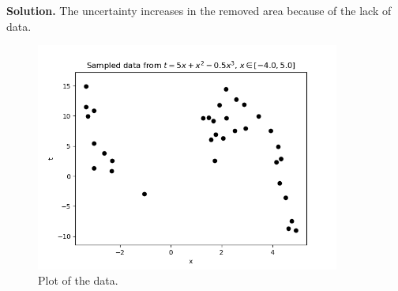 \documentclass[10pt]{article}
\begin{document}
\begin{itemize}
{\bf Solution.}
The uncertainty increases in the removed area because of the lack of data.
\begin{figure}[h!]
\begin{center}
\includegraphics[width=10cm]{figures/ex5_synth_data.png}
\caption{Plot of the data.\label{fig:data}}
\end{center}
\end{figure}

\begin{figure}[h!]
\begin{center}


\end{center}
\end{figure}
\end{itemize}
\end{document}
